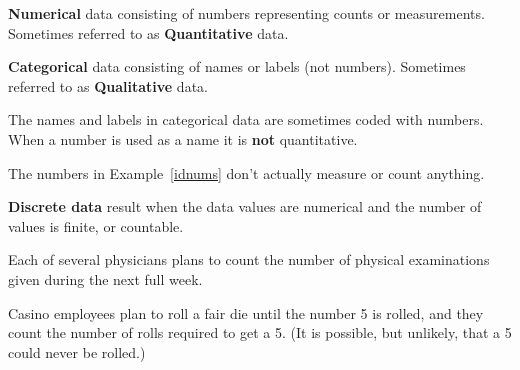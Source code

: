 \documentclass{beamer}
\begin{document}
\begin{frame}
\begin{definition}
\textbf{Numerical} data consisting of numbers representing counts or measurements. Sometimes referred to as \textbf{Quantitative} data.
\end{definition}\pause

\begin{definition}
\textbf{Categorical} data consisting of names or labels (not numbers). Sometimes referred to as \textbf{Qualitative} data.
\end{definition}\pause

\begin{note}
The names and labels in categorical data are sometimes coded with numbers. When a number is used as a name it is \textbf{not} quantitative.
\end{note}
\end{frame}

\begin{frame}
\begin{example}
\pause
{}
\end{example}\pause

\begin{example}
\pause
{}
\end{example}\pause

\begin{example}\label{idnums}
\pause
{}
\end{example}\pause

\begin{note}
The numbers in Example~\ref{idnums} don't actually measure or count anything.
\end{note}
\end{frame}

\begin{frame}
\begin{definition}
\textbf{Discrete data} result when the data values are numerical and the number of values is finite, or countable.
\end{definition}\pause

\begin{example}
Each of several physicians plans to count the number of physical examinations given during the next full week.
\end{example}\pause

\begin{example}
Casino employees plan to roll a fair die until the number 5 is rolled, and they count the number of rolls required to get a 5. (It is possible, but unlikely, that a 5 could never be rolled.)
\end{example}
\end{frame}
\end{document}
